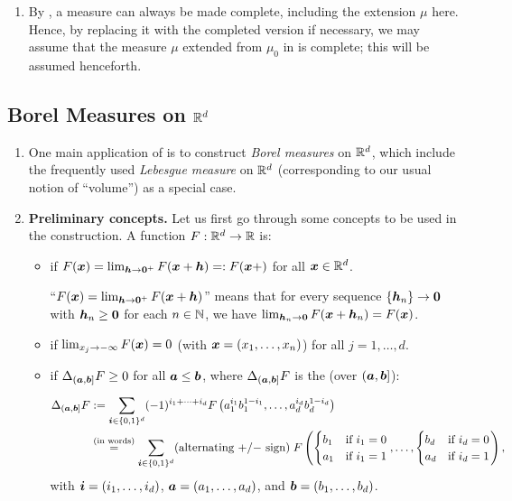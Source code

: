 \begin{enumerate}
\item \label{it:meas-complete-wlog} By , a measure can
always be made complete, including the extension \(\mu\) here. Hence, by
replacing it with the completed version if necessary, we may assume that the
measure \(\mu\) extended from \(\mu_0\) in  is complete;
this will be assumed henceforth.
\end{enumerate}
\subsection{Borel Measures on \(\mathbb{R}^d\)}
\label{subsect:borel-meas-rd}
\begin{enumerate}
\item One main application of  is to construct
\emph{Borel measures} on \(\mathbb{R}^d\), which include the frequently used
\emph{Lebesgue measure} on \(\mathbb{R}^d\) (corresponding to our usual notion of
``volume'') as a special case.

\item \textbf{Preliminary concepts.} Let us first go through some concepts to
be used in the construction. A function \(F:\mathbb{R}^d\to\mathbb{R}\) is:
\begin{itemize}
\item {} if \(F(\bm{x})=\lim_{\bm{h}\to
\bm{0}^{+}}F(\bm{x}+\bm{h})=:F(\bm{x}+)\) for all \(\bm{x}\in\mathbb{R}^d\).

\begin{note}
``\(F(\bm{x})=\lim_{\bm{h}\to \bm{0}^{+}}F(\bm{x}+\bm{h})\)'' means
that for every sequence \(\{\bm{h}_n\}\to\bm{0}\) with
\(\bm{h}_n\ge\bm{0}\) for each \(n\in\mathbb{N}\), we have \(\lim_{\bm{h}_n\to
\bm{0}}F(\bm{x}+\bm{h}_n)=F(\bm{x})\).
\end{note}
\item {} if \(\lim_{x_j\to -\infty}F(\bm{x})=0\) (with
\(\bm{x}=(x_1,\dotsc,x_n)\)) for all \(j=1,\dotsc,d\).
\item {} if \(\Delta_{(\bm{a},\bm{b}]}F\ge 0\) for all
\(\bm{a}\le\bm{b}\), where \(\Delta_{(\bm{a},\bm{b}]}F\) is the
 (over \((\bm{a},\bm{b}]\)):
\begin{align*}
\Delta_{(\bm{a},\bm{b}]}F&:=
\sum_{\bm{i}\in\{0,1\}^{d}}^{}(-1)^{i_{1}+\dotsb+i_{d}}
F\left(a_1^{i_1}b_1^{1-i_1},\dotsc,a_{d}^{i_d}b_{d}^{1-i_{d}}\right) \\
&\overset{\text{(in words)}}{=}
\sum_{\bm{i}\in\{0,1\}^{d}}^{}
(\text{alternating \(+\)/\(-\) sign})\;
F\left(
\begin{cases}
b_1&\text{if \(i_1=0\)} \\
a_1&\text{if \(i_1=1\)}
\end{cases}
,\dotsc,
\begin{cases}
b_d&\text{if \(i_d=0\)} \\
a_d&\text{if \(i_d=1\)}
\end{cases}
\right),
\end{align*}
with \(\bm{i}=(i_1,\dotsc,i_d)\), \(\bm{a}=(a_1,\dotsc,a_d)\), and
\(\bm{b}=(b_1,\dotsc,b_d)\).


\end{itemize}
\end{enumerate}
